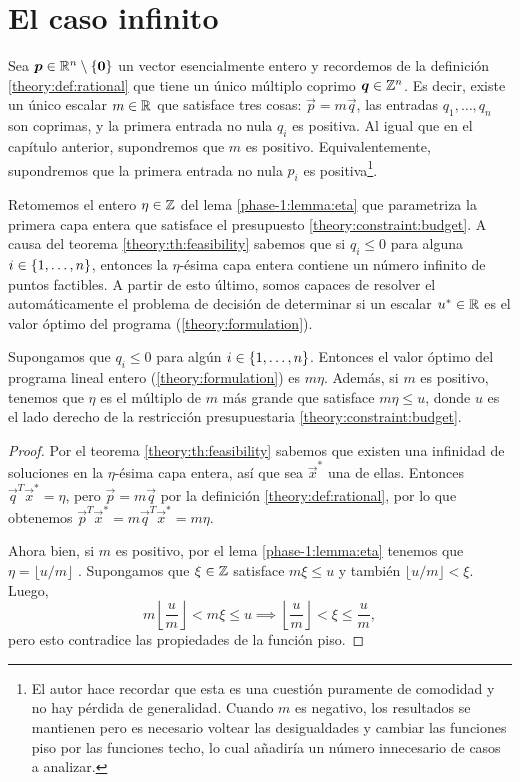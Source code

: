 \chapter{El caso infinito}
\label{chap:inf}


\noindent
Sea $\boldsymbol{p} \in \mathbb{R}^n \setminus \lbrace \boldsymbol{0} \rbrace$ un vector esencialmente entero y recordemos de la
definición \ref{theory:def:rational} que tiene un único múltiplo coprimo $\boldsymbol{q} \in \mathbb{Z}^n$. Es
decir, existe un único escalar $m \in \mathbb{R}$ que satisface tres cosas: $\vec{p} = m\vec{q}$, las
entradas $q_1, \ldots, q_n$ son coprimas, y la primera entrada no nula $q_i$ es positiva. Al igual
que en el capítulo anterior, supondremos que $m$ es positivo. Equivalentemente, supondremos que la
primera entrada no nula $p_i$ es positiva\footnote{ El autor hace recordar que esta es una cuestión
	puramente de comodidad y no hay pérdida de generalidad. Cuando $m$ es negativo, los resultados
se mantienen pero es necesario voltear las desigualdades y cambiar las funciones piso por las
funciones techo, lo cual añadiría un número innecesario de casos a analizar.}.

Retomemos el entero $\eta \in \mathbb{Z}$ del lema \ref{phase-1:lemma:eta} que parametriza la primera capa
entera que satisface el presupuesto \eqref{theory:constraint:budget}. A causa del teorema
\ref{theory:th:feasibility} sabemos que si $q_i \leq 0$ para alguna $i \in \lbrace 1, \ldots, n \rbrace$,
entonces la $\eta$-ésima capa entera contiene un número infinito de puntos factibles. A partir de
esto último, somos capaces de resolver el automáticamente el problema de decisión de determinar si
un escalar $u^* \in \mathbb{R}$ es el valor óptimo del programa (\ref{theory:formulation}).
\begin{corollary}
	\label{cor:inf:obj}
	Supongamos que $q_i \leq 0$ para algún $i \in \lbrace 1, \ldots, n \rbrace$. Entonces el valor óptimo
	del programa lineal entero (\ref{theory:formulation}) es $m\eta$. Además, si $m$ es positivo,
	tenemos que $\eta$ es el múltiplo de $m$ más grande que satisface $m\eta \leq u$, donde $u$ es
	el lado derecho de la restricción presupuestaria \eqref{theory:constraint:budget}.
\end{corollary}
\begin{proof}
	Por el teorema \ref{theory:th:feasibility} sabemos que existen una infinidad de soluciones en la
	$\eta$-ésima capa entera, así que sea $\vec{x}^*$ una de ellas. Entonces $\vec{q}^T\vec{x}^* =
	\eta$, pero $\vec{p} = m\vec{q}$ por la definición \ref{theory:def:rational}, por lo que
	obtenemos $\vec{p}^T\vec{x}^* = m\vec{q}^T\vec{x}^* = m\eta$.

	Ahora bien, si $m$ es positivo, por el lema \ref{phase-1:lemma:eta} tenemos que
	$\eta = \lfloor u/m \rfloor$
	. Supongamos que $\xi \in \mathbb{Z}$ satisface $m\xi \leq u$ y también $\lfloor
	u/m \rfloor < \xi$. Luego,
	\begin{equation*}
		m\left\lfloor \frac{u}{m} \right\rfloor < m\xi \leq u
		\implies \left\lfloor \frac{u}{m} \right\rfloor < \xi \leq \frac{u}{m},
	\end{equation*}
	pero esto contradice las propiedades de la función piso.
\end{proof}

